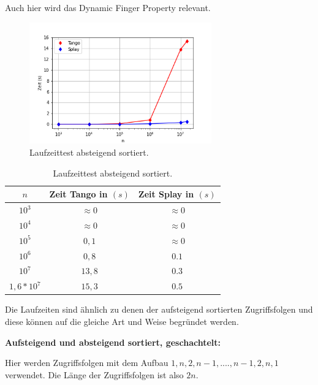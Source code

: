 \documentclass[a4paper,12pt]{article}
\begin{document}
\bigskip


\noindent Auch hier wird das Dynamic Finger Property relevant. 
\begin{figure}[H]
	\centering
	\includegraphics[width=0.7\textwidth]{"Medien/laufzeittest/diagramm/sorted2"}
	\caption{Laufzeittest absteigend sortiert.}
\end{figure}
\begin{table}[H]
	\begin{center}
		\begin{tabular}[c]{|c|c|c|}
			\hline
		$n$ & Zeit Tango in $\left(s\right)$ &Zeit Splay in $\left(s\right)$ \\
		\hline
		$10^3$ & $\approx 0$ &$\approx 0$ \\
		\hline
		$10^4$  & $\approx 0$ &$\approx 0$  \\
		\hline
		$10^5$  & $0,1$ &$\approx 0$  \\
		\hline
		$10^6$  & $0,8$ &$0.1$  \\
		\hline
		$10^7$  & $13,8$ &$0.3$  \\
		\hline
		$1,6 *10^7$  & $15,3$ &$0.5$  \\
		\hline
		\end{tabular}
		\caption{Laufzeittest absteigend sortiert.} 
	\end{center}
\end{table}
\noindent Die Laufzeiten sind ähnlich zu denen der aufsteigend sortierten Zugriffsfolgen und diese können auf die gleiche Art und Weise begründet werden.

 \bigskip
\noindent \textbf{Aufsteigend und absteigend sortiert, geschachtelt:}

\bigskip
\noindent Hier werden Zugriffsfolgen mit dem Aufbau $1, n, 2, n- 1,...., n - 1, 2, n, 1$ verwendet. Die Länge der Zugriffsfolgen ist also $2n$.
\end{document}
